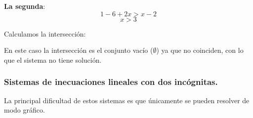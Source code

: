 \documentclass[a4paper,11pt,answers]{exam}
\begin{document}
\begin{questions}
\begin{solution}
    \textbf{La segunda}:
    \[1-6 + 2x > x -2\]
    \[x > 3\]

    Calculamos la intersección:
    \begin{center}
    \end{center}

    En este caso la intersección es el conjunto vacío ($\emptyset$) ya que no coinciden, con
    lo que el sistema no tiene solución.
  \end{solution}
\end{questions}

\subsubsection{Sistemas de inecuaciones lineales con dos incógnitas.}
La principal dificultad de estos sistemas es que únicamente se pueden resolver de modo gráfico.\\
\end{document}
